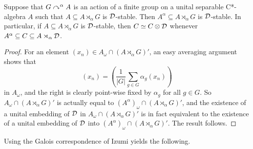 \documentclass[12pt]{amsart}
\begin{document}
    \begin{lemma}\label{lem:fixed-point-in-crossed-product-D-stable}
      Suppose that $G \curvearrowright^\alpha A$ is an action of a finite group on a unital separable C*-algebra $A$ such that $A \subseteq A \rtimes_\alpha G$ is $\mathcal{D}$-stable. Then $A^\alpha \subseteq A \rtimes_\alpha G$ is $\mathcal{D}$-stable. In particular, if $A \subseteq A\rtimes_\alpha G$ is $\mathcal{D}$-stable, then $C \simeq C \otimes \mathcal{D}$ whenever $A^\alpha \subseteq C \subseteq A \rtimes_\alpha \mathcal{D}$.
        \begin{proof}
        For an element $(x_n) \in A_\omega \cap (A \rtimes_\alpha G)'$, an easy averaging argument shows that
\begin{equation}
        (x_n) = \left(\frac{1}{|G|}\sum_{g \in G} \alpha_g(x_n)\right)
\end{equation}
in $A_\omega$, and the right is clearly point-wise fixed by $\alpha_g$ for all $g \in G$. So $A_\omega \cap (A \rtimes_\alpha G)'$ is actually equal to $(A^\alpha)_\omega \cap (A \rtimes_\alpha G)'$, and the existence of a unital embedding of $\mathcal{D}$ in $A_\omega \cap (A \rtimes_\alpha G)'$ is in fact equivalent to the existence of a unital embedding of $\mathcal{D}$ into $(A^\alpha)_\omega \cap (A \rtimes_\alpha G)'$. The result follows.
        \end{proof}
    \end{lemma}


    Using the Galois correspondence of Izumi \cite{Izumi02} yields the following.
\end{document}
